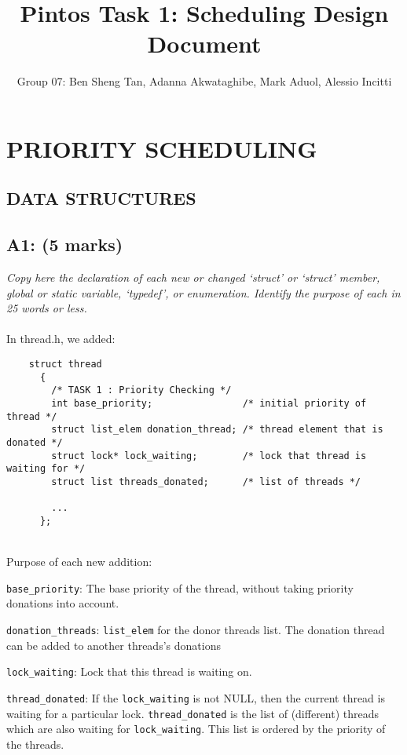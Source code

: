 \documentclass{article}
\title{Pintos Task 1: Scheduling Design Document}
\author{Group 07: Ben Sheng Tan, Adanna Akwataghibe, Mark Aduol, Alessio Incitti }
\begin{document}
\maketitle

\section{PRIORITY SCHEDULING}

\subsection{ DATA STRUCTURES}

\subsection*{A1: (5 marks) }

\textit{Copy here the declaration of each new or changed ‘struct’ or ‘struct’ member, global or static variable, ‘typedef’, or enumeration. Identify the purpose of each in 25 words or less.}
\\ \\
In thread.h, we added:
\begin{lstlisting}
    struct thread
      {
        /* TASK 1 : Priority Checking */
        int base_priority;                /* initial priority of thread */
        struct list_elem donation_thread; /* thread element that is donated */
        struct lock* lock_waiting;        /* lock that thread is waiting for */
        struct list threads_donated;      /* list of threads */

        ...
      };

\end{lstlisting}
\\
Purpose of each new addition:

\texttt{base\_priority}: The base priority of the thread, without taking priority donations into account.

\texttt{donation\_threads}: \texttt{list\_elem} for the donor threads list. The donation thread can be added to another threads's donations

\texttt{lock\_waiting}: Lock that this thread is waiting on.

\texttt{thread\_donated}:  If the \texttt{lock\_waiting} is not NULL, then the current thread is
     waiting for a particular lock. \texttt{thread\_donated} is the list of
     (different) threads which are also waiting for \texttt{lock\_waiting}. This list is ordered by the priority of the threads.
\end{document}
